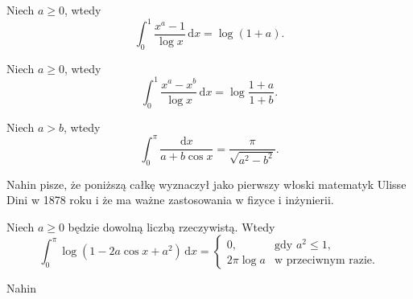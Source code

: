 \begin{problem}
    Niech $a \ge 0$, wtedy
    \begin{equation}
        \int_0^1 \frac{x^a - 1}{\log x} \,\mathrm{d}x = \log(1+a).
    \end{equation}
\end{problem}

\begin{problem}
    Niech $a \ge 0$, wtedy
    \begin{equation}
        \int_0^1 \frac{x^a - x^b}{\log x} \,\mathrm{d}x = \log \frac{1+a}{1+b}.
    \end{equation}
\end{problem}

\begin{problem}
    Niech $a > b$, wtedy
    \begin{equation}
        \int_0^\pi \frac{\mathrm{d}x} {a + b \cos x} = \frac{\pi}{\sqrt{a^2 - b^2}}.
    \end{equation}
\end{problem}

Nahin pisze, że poniższą całkę wyznaczył jako pierwszy włoski matematyk Ulisse Dini w 1878 roku i że ma ważne zastosowania w fizyce i inżynierii.
%

\begin{problem}
    Niech $a \ge 0$ będzie dowolną liczbą rzeczywistą.
    Wtedy
    \begin{equation}
        \int_0^\pi \log (1 - 2 a \cos x + a^2) \,\mathrm{d} x = \begin{cases}
            0, & \text{gdy } a^2 \le 1, \\
            2 \pi \log a & \textrm{w przeciwnym razie}.
        \end{cases}
    \end{equation}
\end{problem}

\begin{solution} %
    Nahin \cite[s. 109-112]{nahin15} %
\end{solution} %

%
